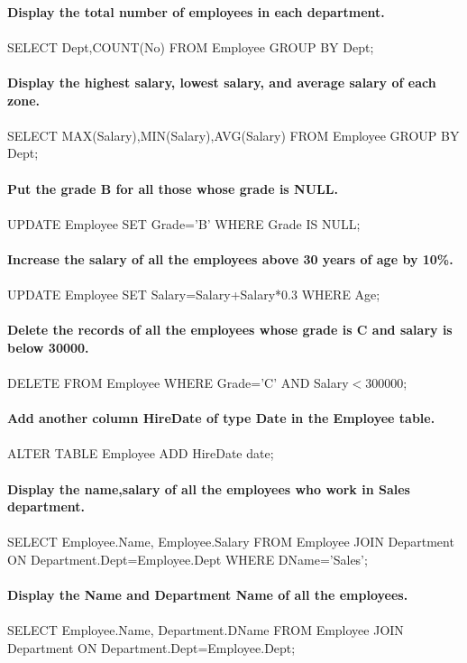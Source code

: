 \documentclass[
a4paper]{article}
\begin{document}
\begin{large}
		\\
		\textbf{Display the total number of employees in each department.}\\
		\\
		SELECT Dept,COUNT(No) FROM Employee GROUP BY Dept;\\
		\\
		\textbf{Display the highest salary, lowest salary, and average salary of each zone.}\\
		\\
		SELECT MAX(Salary),MIN(Salary),AVG(Salary) FROM Employee GROUP BY Dept;\\
		\\
		\textbf{Put the grade B for all those whose grade is NULL.}\\
		\\
		UPDATE Employee SET Grade='B' WHERE Grade IS NULL;\\
		\\
		\textbf{Increase the salary of all the employees above 30 years of age by 10\%.}\\
		\\
		UPDATE Employee SET Salary=Salary+Salary*0.3 WHERE Age;\\
		\\
		\textbf{Delete the records of all the employees whose grade is C and salary is below 30000.}\\
		\\
		DELETE FROM Employee WHERE Grade='C' AND Salary$<$300000;\\
		\\
		\textbf{Add another column HireDate of type Date in the Employee table.}\\
		\\
		ALTER TABLE Employee ADD HireDate date;\\
		\\
		\textbf{Display the name,salary of all the employees who work in Sales department.}\\
		\\
		SELECT Employee.Name, Employee.Salary FROM Employee JOIN Department ON Department.Dept=Employee.Dept WHERE DName='Sales';\\
		\\
		\textbf{Display the Name and Department Name of all the employees.}\\
		\\
		SELECT Employee.Name, Department.DName FROM Employee JOIN Department ON Department.Dept=Employee.Dept;\\
		\\

\end{large}
\end{document}
